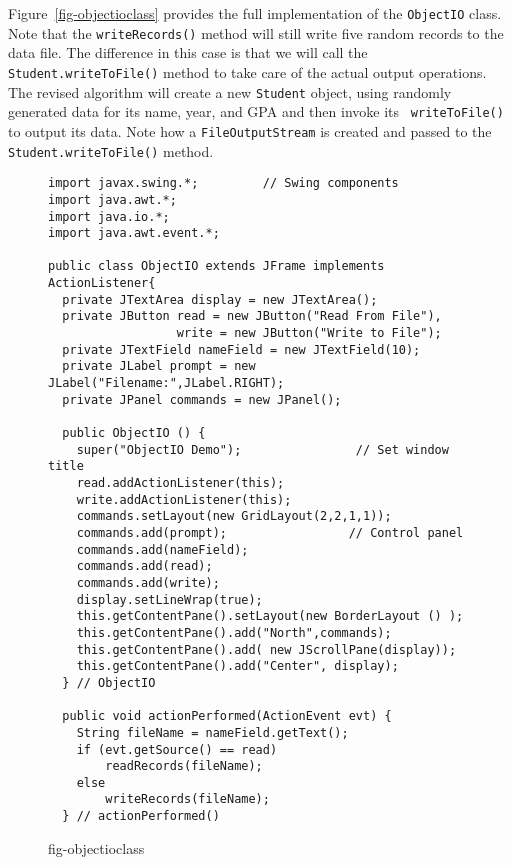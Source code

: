 Figure~\ref{fig-objectioclass} provides the full implementation of the
{\tt ObjectIO} class. Note that the {\tt writeRecords()} method will
still write five random records to the data file.  The difference in
this case is that we will call the {\tt Student.write\-To\-File()}
method to take care of the actual output operations.  The revised
algorithm will create a new {\tt Student} object, using randomly
generated data for its name, year, and GPA and then invoke its {\tt
writeToFile()} to output its data.  Note how a {\tt FileOutputStream}
is created and passed to the {\tt Student.\-writeToFile()} method.

\begin{figure}[h!]
\jjjprogstart
\begin{jjjlisting}[29pc]
\begin{lstlisting}
import javax.swing.*;         // Swing components
import java.awt.*;
import java.io.*;
import java.awt.event.*;

public class ObjectIO extends JFrame implements ActionListener{
  private JTextArea display = new JTextArea();
  private JButton read = new JButton("Read From File"),
                  write = new JButton("Write to File");
  private JTextField nameField = new JTextField(10);
  private JLabel prompt = new JLabel("Filename:",JLabel.RIGHT);
  private JPanel commands = new JPanel();

  public ObjectIO () {
    super("ObjectIO Demo");                // Set window title
    read.addActionListener(this);
    write.addActionListener(this);
    commands.setLayout(new GridLayout(2,2,1,1)); 
    commands.add(prompt);                 // Control panel
    commands.add(nameField);
    commands.add(read);
    commands.add(write);
    display.setLineWrap(true);
    this.getContentPane().setLayout(new BorderLayout () );
    this.getContentPane().add("North",commands);
    this.getContentPane().add( new JScrollPane(display));
    this.getContentPane().add("Center", display);
  } // ObjectIO

  public void actionPerformed(ActionEvent evt) {
    String fileName = nameField.getText();
    if (evt.getSource() == read)
        readRecords(fileName);
    else
        writeRecords(fileName);
  } // actionPerformed()
\end{lstlisting}
\end{jjjlisting}
{fig-objectioclass}
\end{figure}


